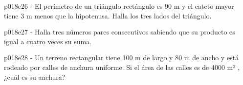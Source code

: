 \documentclass[spanish, 11pt]{exam}
\begin{document}
\begin{questions}
\begin{multicols}{2}
        \end{multicols}
        \question p018e26 - El perímetro de un triángulo rectángulo es 90 m y el cateto mayor tiene 3 m menos que 
la hipotenusa. Halla los tres lados del triángulo.
        \begin{multicols}{2} 
        \end{multicols}
        \question p018e27 - Halla tres números pares consecutivos sabiendo que su 
producto es igual a cuatro veces su suma.
        \begin{multicols}{2} 
        \end{multicols}
        \question p018e28 - Un terreno rectangular tiene 100 m de largo y 80 m de ancho y está rodeado 
por calles de anchura uniforme.
Si el área de las calles es de 4000 m² , ¿cuál es su anchura?
        \begin{multicols}{2} 

\end{multicols}
\end{questions}
\end{document}
